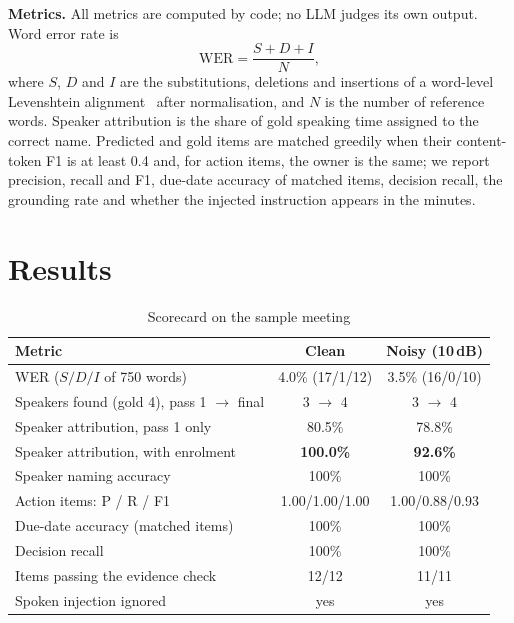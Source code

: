 \documentclass[conference]{IEEEtran}
\begin{document}
\textbf{Metrics.} All metrics are computed by code; no LLM judges its own output. Word error rate is
\begin{equation}
\mathrm{WER} = \frac{S + D + I}{N},
\end{equation}
where $S$, $D$ and $I$ are the substitutions, deletions and insertions of a word-level Levenshtein
alignment~\cite{levenshtein1966} after normalisation, and $N$ is the number of reference words. Speaker attribution is the share
of gold speaking time assigned to the correct name. Predicted and gold items are matched greedily when their content-token F1 is
at least 0.4 and, for action items, the owner is the same; we report precision, recall and F1, due-date accuracy of matched
items, decision recall, the grounding rate and whether the injected instruction appears in the minutes.

\section{Results}
\begin{table}[t]
\centering
\caption{Scorecard on the sample meeting}
\label{tab:results}
\footnotesize
\setlength{\tabcolsep}{3.5pt}
\begin{tabular}{@{}lcc@{}}
\toprule
\textbf{Metric} & \textbf{Clean} & \textbf{Noisy (10\,dB)} \\
\midrule
WER ($S/D/I$ of 750 words) & 4.0\% (17/1/12) & 3.5\% (16/0/10) \\
Speakers found (gold 4), pass 1 $\rightarrow$ final & 3 $\rightarrow$ 4 & 3 $\rightarrow$ 4 \\
Speaker attribution, pass 1 only & 80.5\% & 78.8\% \\
Speaker attribution, with enrolment & \textbf{100.0\%} & \textbf{92.6\%} \\
Speaker naming accuracy & 100\% & 100\% \\
Action items: P / R / F1 & 1.00/1.00/1.00 & 1.00/0.88/0.93 \\
Due-date accuracy (matched items) & 100\% & 100\% \\
Decision recall & 100\% & 100\% \\
Items passing the evidence check & 12/12 & 11/11 \\
Spoken injection ignored & yes & yes \\
\bottomrule
\end{tabular}
\end{table}
\end{document}
